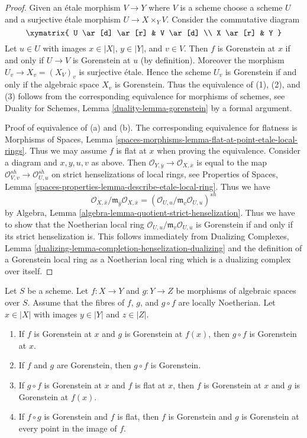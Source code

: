 \begin{proof}
Given an \'etale morphism $V \to Y$ where $V$ is a scheme
choose a scheme $U$ and a surjective \'etale morphism $U \to X \times_Y V$.
Consider the commutative diagram
$$
\xymatrix{
U \ar[d] \ar[r] & V \ar[d] \\
X \ar[r] & Y
}
$$
Let $u \in U$ with images $x \in |X|$, $y \in |Y|$, and $v \in V$.
Then $f$ is Gorenstein at $x$ if and only if $U \to V$ is
Gorenstein at $u$ (by definition). Moreover the morphism
$U_v \to X_v = (X_V)_v$ is surjective \'etale. Hence the scheme $U_v$ is
Gorenstein if and only if the algebraic space $X_v$ is Gorenstein.
Thus the equivalence of (1), (2), and (3) follows from the
corresponding equivalence for morphisms of
schemes, see Duality for Schemes, Lemma \ref{duality-lemma-gorenstein}
by a formal argument.

\medskip\noindent
Proof of equivalence of (a) and (b). The corresponding equivalence
for flatness is Morphisms of Spaces, Lemma
\ref{spaces-morphisms-lemma-flat-at-point-etale-local-rings}.
Thus we may assume $f$ is flat at $x$ when proving the equivalence.
Consider a diagram and $x, y, u, v$ as above. Then
$\mathcal{O}_{Y, \overline{y}} \to \mathcal{O}_{X, \overline{x}}$
is equal to the map
$\mathcal{O}_{V, v}^{sh} \to \mathcal{O}_{U, u}^{sh}$
on strict henselizations of local rings, see
Properties of Spaces, Lemma
\ref{spaces-properties-lemma-describe-etale-local-ring}.
Thus we have
$$
\mathcal{O}_{X, \overline{x}}/
\mathfrak m_{\overline{y}}\mathcal{O}_{X, \overline{x}} =
(\mathcal{O}_{U, u}/\mathfrak m_v \mathcal{O}_{U, u})^{sh}
$$
by Algebra, Lemma \ref{algebra-lemma-quotient-strict-henselization}.
Thus we have to show that the Noetherian local ring
$\mathcal{O}_{U, u}/\mathfrak m_v \mathcal{O}_{U, u}$
is Gorenstein if and only if its strict henselization is.
This follows immediately from
Dualizing Complexes, Lemma
\ref{dualizing-lemma-completion-henselization-dualizing}
and the definition of a Gorenstein local ring as a
Noetherian local ring which is a dualizing complex over itself.
\end{proof}

\begin{lemma}
\label{lemma-composition-gorenstein}
Let $S$ be a scheme.
Let $f : X \to Y$ and $g : Y \to Z$ be morphisms of algebraic spaces
over $S$. Assume that the
fibres of $f$, $g$, and $g \circ f$ are locally Noetherian.
Let $x \in |X|$ with images $y \in |Y|$ and $z \in |Z|$.
\begin{enumerate}
\item If $f$ is Gorenstein at $x$ and $g$ is Gorenstein
at $f(x)$, then $g \circ f$ is Gorenstein at $x$.
\item If $f$ and $g$ are Gorenstein, then $g \circ f$ is Gorenstein.
\item If $g \circ f$ is Gorenstein at $x$ and $f$ is flat at $x$,
then $f$ is Gorenstein at $x$ and $g$ is Gorenstein at $f(x)$.
\item If $f \circ g$ is Gorenstein and $f$ is flat, then
$f$ is Gorenstein and $g$ is Gorenstein at every point in
the image of $f$.
\end{enumerate}
\end{lemma}

